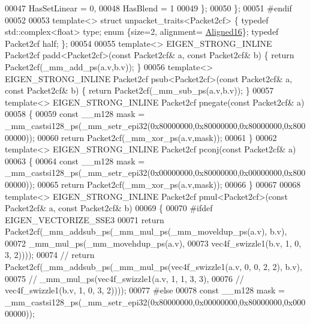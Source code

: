 \begin{DoxyCode}
00047     HasSetLinear = 0,
00048     HasBlend = 1
00049   \};
00050 \};
00051 \textcolor{preprocessor}{#endif}
00052 
00053 \textcolor{keyword}{template}<> \textcolor{keyword}{struct }unpacket\_traits<Packet2cf> \{ \textcolor{keyword}{typedef} std::complex<float> type; \textcolor{keyword}{enum} \{size=2, alignment=
      \hyperlink{group__enums_gga45fe06e29902b7a2773de05ba27b47a1af8e2bf74b04c02199f62c5e3c06dbfcc}{Aligned16}\}; \textcolor{keyword}{typedef} Packet2cf half; \};
00054 
00055 \textcolor{keyword}{template}<> EIGEN\_STRONG\_INLINE Packet2cf padd<Packet2cf>(\textcolor{keyword}{const} Packet2cf& a, \textcolor{keyword}{const} Packet2cf& b) \{ \textcolor{keywordflow}{return} 
      Packet2cf(\_mm\_add\_ps(a.v,b.v)); \}
00056 \textcolor{keyword}{template}<> EIGEN\_STRONG\_INLINE Packet2cf psub<Packet2cf>(\textcolor{keyword}{const} Packet2cf& a, \textcolor{keyword}{const} Packet2cf& b) \{ \textcolor{keywordflow}{return} 
      Packet2cf(\_mm\_sub\_ps(a.v,b.v)); \}
00057 \textcolor{keyword}{template}<> EIGEN\_STRONG\_INLINE Packet2cf pnegate(\textcolor{keyword}{const} Packet2cf& a)
00058 \{
00059   \textcolor{keyword}{const} \_\_m128 mask = \_mm\_castsi128\_ps(\_mm\_setr\_epi32(0x80000000,0x80000000,0x80000000,0x80000000));
00060   \textcolor{keywordflow}{return} Packet2cf(\_mm\_xor\_ps(a.v,mask));
00061 \}
00062 \textcolor{keyword}{template}<> EIGEN\_STRONG\_INLINE Packet2cf pconj(\textcolor{keyword}{const} Packet2cf& a)
00063 \{
00064   \textcolor{keyword}{const} \_\_m128 mask = \_mm\_castsi128\_ps(\_mm\_setr\_epi32(0x00000000,0x80000000,0x00000000,0x80000000));
00065   \textcolor{keywordflow}{return} Packet2cf(\_mm\_xor\_ps(a.v,mask));
00066 \}
00067 
00068 \textcolor{keyword}{template}<> EIGEN\_STRONG\_INLINE Packet2cf pmul<Packet2cf>(\textcolor{keyword}{const} Packet2cf& a, \textcolor{keyword}{const} Packet2cf& b)
00069 \{
00070 \textcolor{preprocessor}{  #ifdef EIGEN\_VECTORIZE\_SSE3}
00071   \textcolor{keywordflow}{return} Packet2cf(\_mm\_addsub\_ps(\_mm\_mul\_ps(\_mm\_moveldup\_ps(a.v), b.v),
00072                                  \_mm\_mul\_ps(\_mm\_movehdup\_ps(a.v),
00073                                             vec4f\_swizzle1(b.v, 1, 0, 3, 2))));
00074 \textcolor{comment}{//   return Packet2cf(\_mm\_addsub\_ps(\_mm\_mul\_ps(vec4f\_swizzle1(a.v, 0, 0, 2, 2), b.v),}
00075 \textcolor{comment}{//                                  \_mm\_mul\_ps(vec4f\_swizzle1(a.v, 1, 1, 3, 3),}
00076 \textcolor{comment}{//                                             vec4f\_swizzle1(b.v, 1, 0, 3, 2))));}
00077 \textcolor{preprocessor}{  #else}
00078   \textcolor{keyword}{const} \_\_m128 mask = \_mm\_castsi128\_ps(\_mm\_setr\_epi32(0x80000000,0x00000000,0x80000000,0x00000000));

\end{DoxyCode}

